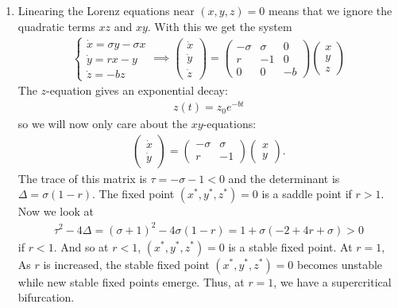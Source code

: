 \documentclass{article}
\theoremstyle{definition}
\begin{document}
\begin{enumerate}[label=(\alph*)]
	
	\item Linearing the Lorenz equations near $(x,y,z)=0$ means that we ignore the quadratic terms $xz$ and $xy$. With this we get the system
	\begin{align*}
	\begin{cases}
	\dot x = \sigma y - \sigma x \\ 
	\dot y = r x - y \\
	\dot z = -bz 
	\end{cases} \implies 
	\begin{pmatrix}
	\dot x \\ \dot y \\ \dot z 
	\end{pmatrix}
	= 
	\begin{pmatrix}
	-\sigma & \sigma & 0 \\ r & -1 & 0 \\ 0 & 0 & -b
	\end{pmatrix}\begin{pmatrix}
	x\\y\\z
	\end{pmatrix}
	\end{align*}
	The $z$-equation gives an exponential decay:
	\begin{align*}
	\boxed{z(t) = z_0 e^{-bt}}
	\end{align*}
	so we will now only care about the $xy$-equations:
	\begin{align*}
	\begin{pmatrix}
	\dot x \\ \dot y 
	\end{pmatrix}
	= 
	\begin{pmatrix}
	-\sigma & \sigma \\ r & -1
	\end{pmatrix}\begin{pmatrix}
	x\\y
	\end{pmatrix}.
	\end{align*}
	The trace of this matrix is $\tau = -\sigma - 1 < 0$ and the determinant is $\Delta = \sigma(1-r)$. The fixed point $(x^*,y^*,z^*)=0$ is a saddle point if $r>1$. Now we look at 
	\begin{align*}
	\tau^2 - 4\Delta = (\sigma + 1)^2 - 4\sigma(1-r) = 1 + \sigma(-2 + 4r + \sigma) > 0
	\end{align*}
	if $r < 1$. And so at $r < 1$, $(x^*,y^*, z^*) = 0$ is a stable fixed point.  At $r=1$, As $r$ is increased, the stable fixed point $(x^*,y^*,z^*)=0$ becomes unstable while new stable fixed points emerge. Thus, at $r=1$, we have a supercritical bifurcation. 
\end{enumerate}
\end{document}
